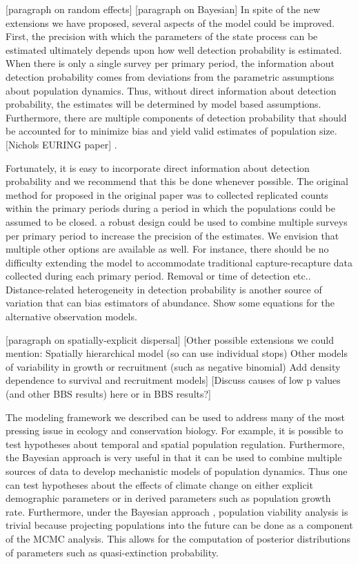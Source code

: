 \documentclass[12pt]{article}
\begin{document}
[paragraph on random effects]
[paragraph on Bayesian]
In spite of the new extensions we have proposed, several aspects of
the model could be improved. First, the precision with which the
parameters of the state process can be estimated ultimately depends
upon how well detection probability is estimated. When there is only a
single survey per primary period, the information about detection
probability comes from deviations from the parametric assumptions
about population dynamics. Thus, without direct information about
detection probability, the estimates will be determined by model based
assumptions. Furthermore, there are multiple components of detection
probability that should be accounted for to minimize bias and yield
valid estimates of population size. [Nichols EURING paper] .

Fortunately, it is easy to incorporate direct information about
detection probability and we recommend that this be done whenever
possible. The original method for proposed in the original paper was
to collected replicated counts within the primary periods during a
period in which the populations could be assumed to be closed.  a
robust design could be used to combine multiple surveys per primary
period to increase the precision of the estimates. We envision that
multiple other options are available as well. For instance, there
should be no difficulty extending the model to accommodate traditional
capture-recapture data collected during each primary period. Removal
or time of detection etc.. Distance-related heterogeneity in detection
probability is another source of variation that can bias estimators of
abundance.   Show some equations for the alternative observation
models.

[paragraph on spatially-explicit dispersal]
[Other possible extensions we could mention:
Spatially hierarchical model (so can use individual stops)
Other models of variability in growth or recruitment (such as negative binomial)
Add density dependence to survival and recruitment models]
[Discuss causes of low p values (and other BBS results) here or in BBS
results?]

The modeling framework we described can be used to address many of the
most pressing issue in ecology and conservation biology. For example,
it is possible to test hypotheses about temporal and spatial
population regulation. Furthermore, the Bayesian approach is very
useful in that it can be used to combine multiple sources of data to
develop mechanistic models of population dynamics. Thus one can test
hypotheses about the effects of climate change on either explicit
demographic parameters or in derived parameters such as population
growth rate. Furthermore, under the Bayesian approach , population
viability analysis is trivial because projecting populations into the
future can be done as a component of the MCMC analysis. This allows
for the computation of posterior distributions of parameters such as
quasi-extinction probability.





\end{document}
